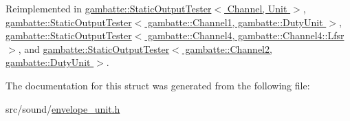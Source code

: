 Reimplemented in \hyperlink{classgambatte_1_1StaticOutputTester_a133c2bb69dd470d954954d4518dcdd4c}{gambatte\+::\+Static\+Output\+Tester$<$ Channel, Unit $>$}, \hyperlink{classgambatte_1_1StaticOutputTester_a133c2bb69dd470d954954d4518dcdd4c}{gambatte\+::\+Static\+Output\+Tester$<$ gambatte\+::\+Channel1, gambatte\+::\+Duty\+Unit $>$}, \hyperlink{classgambatte_1_1StaticOutputTester_a133c2bb69dd470d954954d4518dcdd4c}{gambatte\+::\+Static\+Output\+Tester$<$ gambatte\+::\+Channel4, gambatte\+::\+Channel4\+::\+Lfsr $>$}, and \hyperlink{classgambatte_1_1StaticOutputTester_a133c2bb69dd470d954954d4518dcdd4c}{gambatte\+::\+Static\+Output\+Tester$<$ gambatte\+::\+Channel2, gambatte\+::\+Duty\+Unit $>$}.



The documentation for this struct was generated from the following file\+:\begin{DoxyCompactItemize}
\item 
src/sound/\hyperlink{envelope__unit_8h}{envelope\+\_\+unit.\+h}\end{DoxyCompactItemize}
